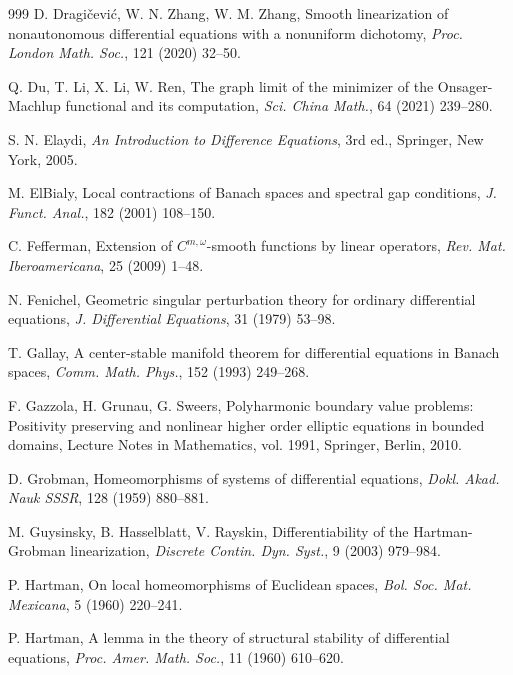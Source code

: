 \documentclass[reqno]{amsart}
\numberwithin{equation}{section}
\begin{document}
\begin{thebibliography}{999}
D. Dragi\v{c}evi\'{c}, W. N. Zhang, W. M. Zhang,
Smooth linearization of nonautonomous differential equations with a nonuniform dichotomy, {\em Proc. London Math. Soc.}, 121 (2020) 32--50.

Q. Du, T. Li, X. Li, W. Ren,  The graph limit of the minimizer of the
Onsager-Machlup functional and its computation, {\em Sci. China Math.}, 64 (2021) 239--280.


 S. N. Elaydi, {\it An Introduction to Difference Equations}, 3rd ed., Springer, New York, 2005.

M. ElBialy,
  Local contractions of Banach spaces and spectral gap conditions, {\em J. Funct. Anal.}, 182 (2001) 108--150.

C. Fefferman, Extension of $C^{m,\omega}$-smooth functions
by linear operators, {\em Rev. Mat. Iberoamericana}, 25 (2009) 1--48.

 N. Fenichel,  Geometric singular perturbation theory for ordinary differential equations,
{\em J. Differential Equations},  31 (1979) 53--98.

T. Gallay, A center-stable manifold theorem for differential equations in Banach spaces,
{\em Comm. Math. Phys.},  152 (1993) 249--268.

F. Gazzola, H. Grunau, G. Sweers, Polyharmonic boundary value problems: Positivity preserving and nonlinear
higher order elliptic equations in bounded domains, Lecture Notes in Mathematics, vol. 1991, Springer,
Berlin, 2010.

D. Grobman, Homeomorphisms of systems of differential equations, {\em Dokl. Akad. Nauk SSSR}, 128 (1959) 880--881.

M. Guysinsky, B. Hasselblatt,   V.  Rayskin, Differentiability of the Hartman-Grobman linearization, {\em Discrete Contin. Dyn. Syst.},  9 (2003)  979--984.

P. Hartman, On local homeomorphisms of Euclidean spaces, {\em Bol. Soc. Mat. Mexicana}, 5 (1960) 220--241.

P. Hartman, A lemma in the theory of structural stability of differential equations, {\em Proc. Amer. Math. Soc.}, 11  (1960) 610--620.


\end{thebibliography}
\end{document}
